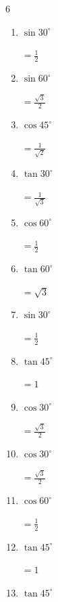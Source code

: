 \begin{multicols}{6}
\begin{enumerate}
        $\displaystyle =\frac{1}{\sqrt{3}}$

  \item $\displaystyle \sin{30^\circ}$

        $\displaystyle =\frac{1}{2}$

\columnbreak %

  \item $\displaystyle \sin{60^\circ}$

        $\displaystyle =\frac{\sqrt{3}}{2}$

  \item $\displaystyle \cos{45^\circ}$

        $\displaystyle =\frac{1}{\sqrt{2}}$

  \item $\displaystyle \tan{30^\circ}$

        $\displaystyle =\frac{1}{\sqrt{3}}$

  \item $\displaystyle \cos{60^\circ}$

        $\displaystyle =\frac{1}{2}$

  \item $\displaystyle \tan{60^\circ}$

        $\displaystyle =\sqrt{3}$

  \item $\displaystyle \sin{30^\circ}$

        $\displaystyle =\frac{1}{2}$

  \item $\displaystyle \tan{45^\circ}$

        $\displaystyle =1$

  \item $\displaystyle \cos{30^\circ}$

        $\displaystyle =\frac{\sqrt{3}}{2}$

  \item $\displaystyle \cos{30^\circ}$

        $\displaystyle =\frac{\sqrt{3}}{2}$

  \item $\displaystyle \cos{60^\circ}$

        $\displaystyle =\frac{1}{2}$

  \item $\displaystyle \tan{45^\circ}$

        $\displaystyle =1$

  \item $\displaystyle \tan{45^\circ}$


\end{enumerate}
\end{multicols}
